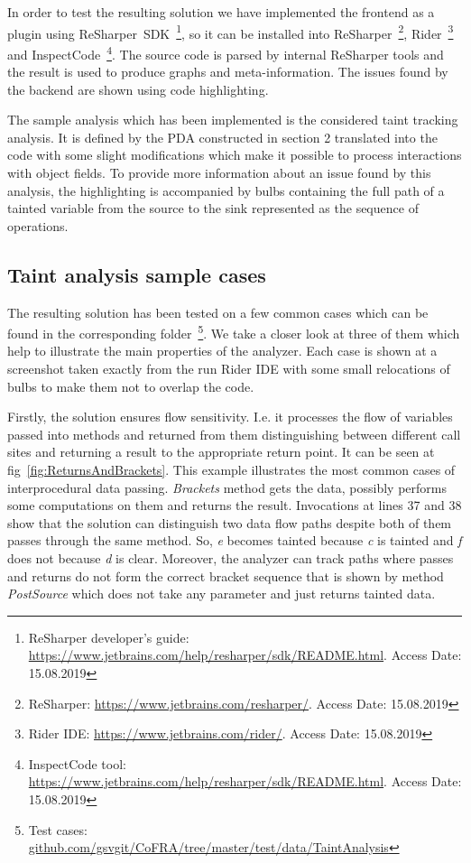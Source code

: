 In order to test the resulting solution we have implemented the frontend as a plugin using ReSharper~SDK~\footnote{ReSharper developer's guide: \url{https://www.jetbrains.com/help/resharper/sdk/README.html}. Access Date: 15.08.2019}, so it can be installed into ReSharper~\footnote{ReSharper: \url{https://www.jetbrains.com/resharper/}. Access Date: 15.08.2019}, Rider~\footnote{Rider IDE: \url{https://www.jetbrains.com/rider/}. Access Date: 15.08.2019} and InspectCode~\footnote{InspectCode tool: \url{https://www.jetbrains.com/help/resharper/sdk/README.html}. Access Date: 15.08.2019}.
The source code is parsed by internal ReSharper tools and the result is used to produce graphs and meta-information.
The issues found by the backend are shown using code highlighting.

The sample analysis which has been implemented is the considered taint tracking analysis.
It is defined by the PDA constructed in section 2 translated into the code with some slight modifications which make it possible to process interactions with object fields.
To provide more information about an issue found by this analysis, the highlighting is accompanied by bulbs containing the full path of a tainted variable from the source to the sink represented as the sequence of operations.

\subsection{Taint analysis sample cases}

The resulting solution has been tested on a few common cases which can be found in the corresponding folder~\footnote{Test cases: \url{github.com/gsvgit/CoFRA/tree/master/test/data/TaintAnalysis}}.
We take a closer look at three of them which help to illustrate the main properties of the analyzer.
Each case is shown at a screenshot taken exactly from the run Rider IDE with some small relocations of bulbs to make them not to overlap the code.

Firstly, the solution ensures flow sensitivity. I.e. it processes the flow of variables passed into methods and returned from them distinguishing between different call sites and returning a result to the appropriate return point.
It can be seen at fig~\ref{fig:ReturnsAndBrackets}.
This example illustrates the most common cases of interprocedural data passing.
\textit{Brackets} method gets the data, possibly performs some computations on them and returns the result.
Invocations at lines 37 and 38 show that the solution can distinguish two data flow paths despite both of them passes through the same method.
So, \textit{e} becomes tainted because \textit{c} is tainted and \textit{f} does not because \textit{d} is clear.
Moreover, the analyzer can track paths where passes and returns do not form the correct bracket sequence that is shown by method \textit{PostSource} which does not take any parameter and just returns tainted data.

